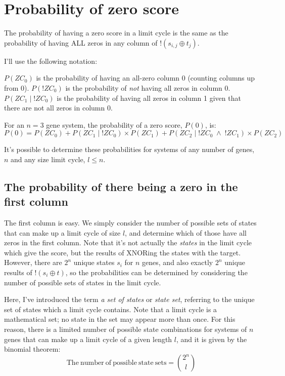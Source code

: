 \documentclass[11pt, a4paper]{article}
\begin{document}
\section{Probability of zero score}

The probability of having a zero score in a limit cycle is the same as
the probability of having ALL zeros in any column of $!(s_{i,j} \oplus
t_j)$.

I'll use the following notation:

$P(ZC_0)$ is the probability of having an all-zero column 0 (counting
columns up from 0). $P(!ZC_0)$ is the probability of \emph{not} having
all zeros in column 0. $P(ZC_1\;|\;!ZC_0)$ is the probability of having all
zeros in column 1 given that there are not all zeros in column 0.

For an $n=3$ gene system, the probability of a zero score, $P(0)$, is:
\begin{equation} \label{eq:pzero}
P(0) = P(ZC_0) + P(ZC_1\;|\;!ZC_0) \times P(ZC_1) + P(ZC_2\;|\;!ZC_0\;\land\;!ZC_1) \times P(ZC_2)
\end{equation}

It's possible to determine these probabilities for systems of any
number of genes, $n$ and any size limit cycle, $l\leq n $.

\subsection{The probability of there being a zero in the first column}

The first column is easy. We simply consider the number of possible
sets of states that can make up a limit cycle of size $l$, and
determine which of those have all zeros in the first column. Note that
it's not actually the \emph{states} in the limit cycle which give the
score, but the results of XNORing the states with the target. However,
there are $2^n$ unique states $s_i$ for $n$ genes, and also exactly
$2^n$ unique results of $!(s_i \oplus t)$, so the probabilities can be
determined by considering the number of possible sets of states in the
limit cycle.

Here, I've introduced the term \emph{a set of states} or \emph{state
set}, referring to the unique set of states which a limit cycle
contains. Note that a limit cycle is a mathematical set; no state in
the set may appear more than once. For this reason, there is a limited
number of possible state combinations for systems of $n$ genes that
can make up a limit cycle of a given length $l$, and it is given by
the binomial theorem:
\begin{equation}
\mathrm{The~number~of~possible~state~sets} = \binom{2^n}{l}
\end{equation}
\end{document}
